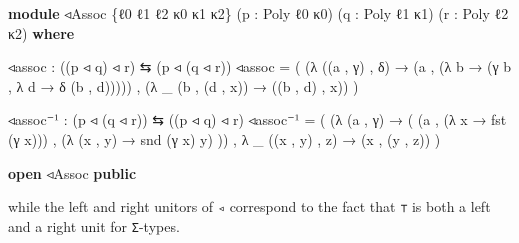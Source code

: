 \documentclass[
  11pt,
  oneside,
  article]{memoir}
\newenvironment{Shaded}{}{}
\newcommand{\KeywordTok}[1]{\textcolor[rgb]{0.00,0.44,0.13}{\textbf{#1}}}
\newcommand{\NormalTok}[1]{#1}
\newcommand{\OtherTok}[1]{\textcolor[rgb]{0.00,0.44,0.13}{#1}}
\theoremstyle{definition}
\theoremstyle{plain}
\newcommand{\0}{\textsf{0}}
\newcommand{\1}{\tn{\textsf{1}}}
\begin{document}
\begin{Shaded}
\begin{Highlighting}[]
\KeywordTok{module}\NormalTok{ ◃Assoc }\OtherTok{\{}\NormalTok{ℓ0 ℓ1 ℓ2 κ0 κ1 κ2}\OtherTok{\}} \OtherTok{(}\NormalTok{p }\OtherTok{:}\NormalTok{ Poly ℓ0 κ0}\OtherTok{)} 
              \OtherTok{(}\NormalTok{q }\OtherTok{:}\NormalTok{ Poly ℓ1 κ1}\OtherTok{)} \OtherTok{(}\NormalTok{r }\OtherTok{:}\NormalTok{ Poly ℓ2 κ2}\OtherTok{)} \KeywordTok{where}

\NormalTok{    ◃assoc }\OtherTok{:} \OtherTok{((}\NormalTok{p ◃ q}\OtherTok{)}\NormalTok{ ◃ r}\OtherTok{)}\NormalTok{ ⇆ }\OtherTok{(}\NormalTok{p ◃ }\OtherTok{(}\NormalTok{q ◃ r}\OtherTok{))}
\NormalTok{    ◃assoc }\OtherTok{=} \OtherTok{(} \OtherTok{(λ} \OtherTok{((}\NormalTok{a , γ}\OtherTok{)}\NormalTok{ , δ}\OtherTok{)} 
                  \OtherTok{→} \OtherTok{(}\NormalTok{a , }\OtherTok{(λ}\NormalTok{ b }\OtherTok{→} \OtherTok{(}\NormalTok{γ b , }\OtherTok{λ}\NormalTok{ d }\OtherTok{→}\NormalTok{ δ }\OtherTok{(}\NormalTok{b , d}\OtherTok{)))))} 
\NormalTok{             , }\OtherTok{(λ} \OtherTok{\_} \OtherTok{(}\NormalTok{b , }\OtherTok{(}\NormalTok{d , x}\OtherTok{))} \OtherTok{→} \OtherTok{((}\NormalTok{b , d}\OtherTok{)}\NormalTok{ , x}\OtherTok{))} \OtherTok{)}
    
\NormalTok{    ◃assoc⁻¹ }\OtherTok{:} \OtherTok{(}\NormalTok{p ◃ }\OtherTok{(}\NormalTok{q ◃ r}\OtherTok{))}\NormalTok{ ⇆ }\OtherTok{((}\NormalTok{p ◃ q}\OtherTok{)}\NormalTok{ ◃ r}\OtherTok{)}
\NormalTok{    ◃assoc⁻¹ }\OtherTok{=} \OtherTok{(} \OtherTok{(λ} \OtherTok{(}\NormalTok{a , γ}\OtherTok{)} \OtherTok{→} \OtherTok{(} \OtherTok{(}\NormalTok{a , }\OtherTok{(λ}\NormalTok{ x }\OtherTok{→}\NormalTok{ fst }\OtherTok{(}\NormalTok{γ x}\OtherTok{)))} 
\NormalTok{                              , }\OtherTok{(λ} \OtherTok{(}\NormalTok{x , y}\OtherTok{)} \OtherTok{→}\NormalTok{ snd }\OtherTok{(}\NormalTok{γ x}\OtherTok{)}\NormalTok{ y}\OtherTok{)} \OtherTok{))}
\NormalTok{               , }\OtherTok{λ} \OtherTok{\_} \OtherTok{((}\NormalTok{x , y}\OtherTok{)}\NormalTok{ , z}\OtherTok{)} \OtherTok{→} \OtherTok{(}\NormalTok{x , }\OtherTok{(}\NormalTok{y , z}\OtherTok{))} \OtherTok{)}

\KeywordTok{open}\NormalTok{ ◃Assoc }\KeywordTok{public}
\end{Highlighting}
\end{Shaded}

while the left and right unitors of \texttt{◃} correspond to the fact
that \texttt{⊤} is both a left and a right unit for \texttt{Σ}-types.
\end{document}
